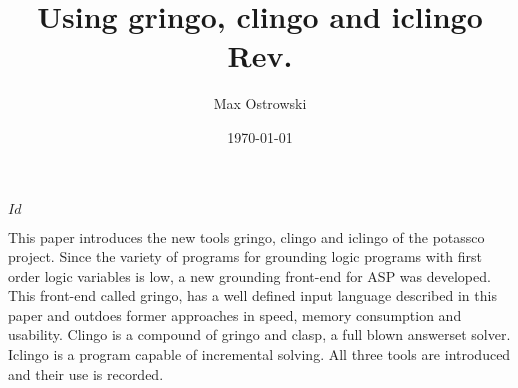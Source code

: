 \documentclass[a4paper,10pt]{article}
\author{Max Ostrowski}
\title{Using gringo, clingo and iclingo
\\\small{Rev.\svnInfoRevision}
}
\date{\today}
\begin{document}
\svnInfo $Id$
\maketitle
\begin{center}\stamp\end{center}

\abstract{}
This paper introduces the new tools gringo, clingo and iclingo of the potassco project\cite{download}.
Since the variety of programs for grounding logic programs with first order logic variables is low, a new grounding front-end for ASP was developed. This front-end called gringo, has a well defined input language described in this paper and outdoes former approaches in speed, memory consumption and usability.
Clingo is a compound of gringo and clasp, a full blown answerset solver.
Iclingo is a program capable of incremental solving.
All three tools are introduced and their use is recorded.

\tableofcontents
\end{document}
